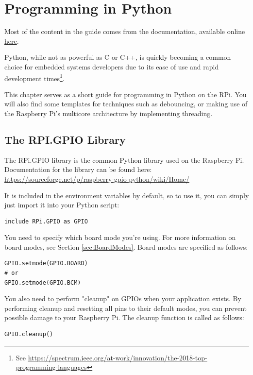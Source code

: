 \section{Programming in Python}
\label{app:Python}
Most of the content in the guide comes from the documentation, available online \href{https://sourceforge.net/p/raspberry-gpio-python/wiki/Home/}{here}.

Python, while not as powerful as C or C++, is quickly becoming a common choice for embedded systems developers due to its ease of use and rapid development times\footnote{See \href{https://spectrum.ieee.org/at-work/innovation/the-2018-top-programming-languages}{https://spectrum.ieee.org/at-work/innovation/the-2018-top-programming-languages}}. 

This chapter serves as a short guide for programming in Python on the RPi. You will also find some templates for techniques such as debouncing, or making use of the Raspberry Pi's multicore architecture by implementing threading.

\subsection{The RPI.GPIO Library}
The RPi.GPIO library is the common Python library used on the Raspberry Pi. 
Documentation for the library can be found here:\\
\href{https://sourceforge.net/p/raspberry-gpio-python/wiki/Home/}{https://sourceforge.net/p/raspberry-gpio-python/wiki/Home/}

It is included in the environment variables by default, so to use it, you can simply just import it into your Python script:

\begin{lstlisting}
include RPi.GPIO as GPIO
\end{lstlisting}

You need to specify which board mode you're using. For more information on board modes, see Section \ref{sec:BoardModes}. Board modes are specified as follows:
\begin{lstlisting}
GPIO.setmode(GPIO.BOARD)
# or
GPIO.setmode(GPIO.BCM)
\end{lstlisting}

You also need to perform "cleanup" on GPIOs when your application exists. By performing cleanup and resetting all pins to their default modes, you can prevent possible damage to your Raspberry Pi. The cleanup function is called as follows:
\begin{lstlisting}
GPIO.cleanup()
\end{lstlisting}

